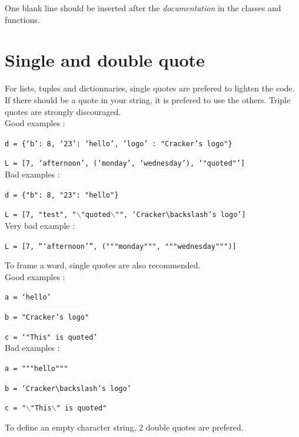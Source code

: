 \documentclass[a4paper,10pt]{report}
\begin{document}
   One blank line should be inserted after the \emph{documentation} in the classes and functions.
  
  
  \section{Single and double quote}
   For lists, tuples and dictionnaries, single quotes are prefered to lighten the code. If there should be a quote in your string, it is prefered to use the others. Triple quotes are strongly discouraged. \\
  
  
   \noindent Good examples :
   
   \texttt{d = \{`b': 8, `23': `hello', `logo' : "Cracker's logo"\}}
   
   \texttt{L = [7, `afternoon', (`monday', `wednesday'), `"quoted"']} \\
   
   
   \noindent Bad examples :
   
   \texttt{d = \{"b": 8, "23": "hello"\}}
   
   \texttt{L = [7, "test", "$\backslash$"quoted$\backslash$"", `Cracker$\backslash$'s logo']} \\
   
   
   \noindent Very bad example :
   
   \texttt{L = [7, ```afternoon''', ("""monday""", """wednesday""")]} \newline \newline
   
   
   \noindent To frame a word, single quotes are also recommended. \\
   
   \noindent Good examples :
   
   \texttt{a = `hello'}
   
   \texttt{b = "Cracker's logo"}
   
   \texttt{c = `"This" is quoted'} \\
   
   
   \noindent Bad examples :
   
   \texttt{a = """hello"""}
   
   \texttt{b = `Cracker$\backslash$'s logo'}
   
   \texttt{c = "$\backslash$"This$\backslash$" is quoted"} \newline \newline
   
   
   \noindent To define an empty character string, 2 double quotes are prefered. \\
   
\end{document}
